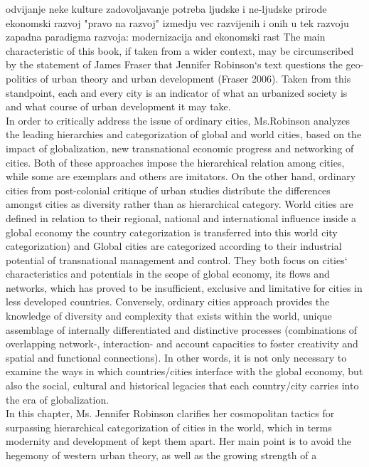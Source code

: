 \documentclass[11pt]{report}
\begin{document}
    odvijanje neke kulture
    zadovoljavanje potreba ljudske i ne-ljudske prirode
    ekonomski razvoj
    "pravo na razvoj" izmedju vec razvijenih i onih u tek razvoju
    zapadna paradigma razvoja: modernizacija and ekonomski rast
The  main  characteristic  of  this  book,  if  taken  from  a  wider  context,  may  be  circumscribed  by  the 
statement of James Fraser that Jennifer Robinson‘s text questions the geo-politics of urban theory and 
urban development (Fraser 2006). Taken from this standpoint, each and every city is an indicator of what an urbanized society is and what course of urban development it may take.
\\
In order to critically address the issue of ordinary cities, Ms.Robinson analyzes the leading hierarchies and categorization of global and world cities, based on the impact of globalization, new transnational  economic  progress  and  networking  of  cities. Both of these approaches impose the hierarchical relation among cities, while some are exemplars and others are imitators. On the other hand, ordinary cities from post-colonial critique of urban studies distribute the differences amongst cities as diversity rather than as hierarchical category. 
World cities are defined in relation to their regional, national and international influence inside a global economy the country categorization is transferred into this world city categorization) and Global cities are categorized according to their industrial potential of transnational management and control. They both  focus  on  cities‘ characteristics  and potentials in the scope of global economy, its flows and networks, which has proved to be insufficient, exclusive  and limitative for cities in less developed countries. 
Conversely, ordinary cities approach provides the knowledge of diversity and complexity that exists within the world, unique assemblage of internally differentiated and distinctive processes (combinations of overlapping network-, interaction- and account capacities to foster creativity and spatial and functional connections). In other words, it is not only necessary to examine the ways in which countries/cities interface with the global economy, but also the social, cultural and historical legacies that each country/city carries into the era of globalization.
\\
In  this  chapter, Ms. Jennifer Robinson  clarifies  her  cosmopolitan  tactics  for  surpassing  hierarchical categorization of cities in the world, which in terms modernity and development of kept them apart. Her 
main point is to avoid the hegemony of western urban theory, as  well as the growing  strength of a 
\end{document}
